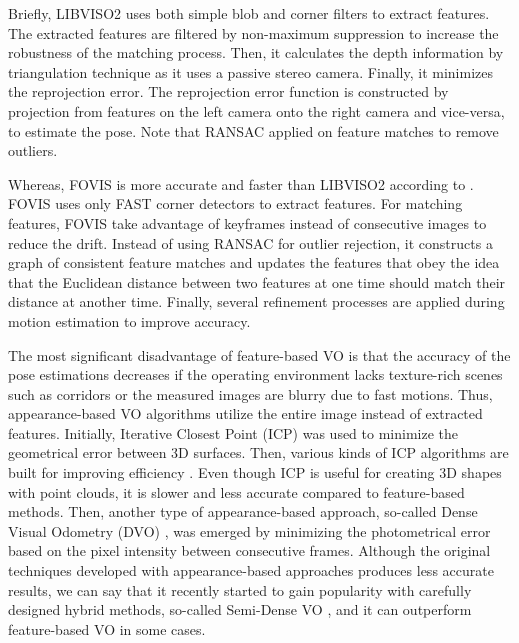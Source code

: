 \documentclass[a4paper]{report}
\numberwithin{figure}{section}
\begin{document}
Briefly, LIBVISO2 uses both 
simple blob and corner filters to extract features. The extracted features are 
filtered by non-maximum suppression to increase the robustness of the matching 
process. Then, it calculates the depth information by triangulation technique 
as it uses a passive stereo camera. Finally, it minimizes the reprojection 
error. The reprojection error function is constructed by projection from 
features on the left camera onto the right camera and vice-versa, to estimate 
the pose. Note that RANSAC applied on feature matches to remove outliers. 

Whereas, FOVIS is more accurate and faster than LIBVISO2 according to 
\parencite{Fang2015a}.
FOVIS uses only FAST corner detectors to extract features. For matching 
features, FOVIS take advantage of keyframes instead of consecutive images to 
reduce the drift. Instead of using RANSAC for outlier rejection, it constructs 
a graph of consistent feature matches and updates the features that obey the 
idea that the Euclidean distance between two features at one time should match 
their distance at another time. Finally, several refinement processes are 
applied during motion estimation to improve accuracy.

The most significant disadvantage of feature-based VO is that the accuracy of 
the pose estimations decreases if the operating environment lacks texture-rich 
scenes such as corridors or the measured images are blurry due to fast 
motions. Thus, appearance-based VO algorithms utilize the entire image instead 
of extracted features. Initially, Iterative Closest Point (ICP) 
\parencite{Besl1992} was used to minimize the geometrical error between 3D 
surfaces. Then, various kinds of ICP algorithms are built for improving 
efficiency \parencite{Rusinkiewicz2001}. Even though ICP is useful for 
creating 
3D 
shapes with point clouds, it is slower and less accurate compared to 
feature-based methods.
Then, another type of appearance-based approach, so-called Dense Visual 
Odometry (DVO) \parencite{Kerl2013a}, was emerged by minimizing the 
photometrical 
error based on the pixel intensity between consecutive frames. Although the 
original techniques developed with appearance-based approaches produces less 
accurate results, we can say that it recently started to gain popularity with 
carefully designed hybrid methods, so-called Semi-Dense VO 
\parencite{Zhou2017a}, 
and it can outperform feature-based VO in some cases.
\end{document}
